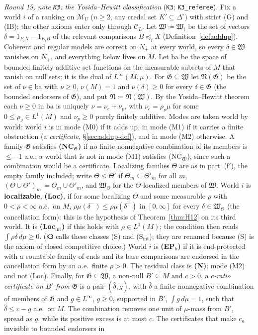 \documentclass[11pt]{article}
\theoremstyle{definition}
\theoremstyle{remark}
\newcommand{\Di}{\Delta^{\circ}}
\newcommand{\M}{\mathcal M}
\newcommand{\C}{\mathcal C}
\newcommand{\src}[1]{\texttt{#1}}
\begin{document}
\emph{Round 19, note \src{K3}: the Yosida--Hewitt classification} (\src{K3}; \src{K3\_referee}). Fix a world $i$ of a ranking on $\M_U$ ($n\ge2$, any credal set $K'\subseteq\Di$) with strict (G) and (IB); the other axioms enter only through $\C_L$. Let $\mathfrak W\coloneqq\mathfrak W_i$ be the set of vectors $\delta=1_{E_iX}-1_{E_iB}$ of the relevant comparisons $B\preceq_iX$ (Definition~\ref{def:addup}). Coherent and regular models are correct on $N_+$ at every world, so every $\delta\in\mathfrak W$ vanishes on $N_+$, and everything below lives on $M$. Let $\mathrm{ba}$ be the space of bounded finitely additive set functions on the measurable subsets of $M$ that vanish on null sets; it is the dual of $L^\infty(M,\mu)$. For $\mathfrak G\subseteq\mathfrak W$ let $\mathfrak N(\mathfrak G)$ be the set of $\nu\in\mathrm{ba}$ with $\nu\ge0$, $\nu(M)=1$ and $\nu(\delta)\ge0$ for every $\delta\in\mathfrak G$ (the bounded endorsers of $\mathfrak G$), and put $\mathfrak N\coloneqq\mathfrak N(\mathfrak W)$. By the Yosida--Hewitt theorem each $\nu\ge0$ in $\mathrm{ba}$ is uniquely $\nu=\nu_c+\nu_p$, with $\nu_c=\rho_\nu\mu$ for some $0\le\rho_\nu\in L^1(M)$ and $\nu_p\ge0$ purely finitely additive. Modes are taken world by world: world $i$ is in mode (M0) if it adds up, in mode (M1) if it carries a finite obstruction (a \emph{certificate}, \S\ref{sec:addup-def}), and in mode (M2) otherwise. A family $\mathfrak G$ satisfies \textbf{(NC$_{\mathfrak G}$)} if no finite nonnegative combination of its members is $\le-1$ a.e.; a world that is not in mode (M1) satisfies (NC$_{\mathfrak W}$), since such a combination would be a certificate. Localizing families $\Theta$ are as in part~(f$'$), the empty family included; write $\Theta\le\Theta'$ if $\Theta_m\subseteq\Theta'_m$ for all $m$, $(\Theta\cup\Theta')_m\coloneqq\Theta_m\cup\Theta'_m$, and $\mathfrak W_\Theta$ for the $\Theta$-localized members of $\mathfrak W$. World $i$ is \textbf{localizable}, \textbf{(Loc)}, if for some localizing $\Theta$ and some measurable $\rho$ with $0<\rho<\infty$ a.e.\ on $M$, $\rho\mu(\delta^-)\le\rho\mu(\delta^+)$ in $[0,\infty]$ for every $\delta\in\mathfrak W_\Theta$ (the cancellation form): this is the hypothesis of Theorem~\ref{thm:H12} on its third world. It is \textbf{(Loc$_{\mathrm{int}}$)} if this holds with $\rho\in L^1(M)$; the condition then reads $\int\rho\delta\,d\mu\ge0$. (\src{K3} calls these classes (S) and (S$_{\mathrm{int}}$); they are renamed because (S) is the axiom of closed competitive choice.) World $i$ is \textbf{(EP$_{\mathrm b}$)} if it is end-protected with a countable family of ends and its base comparisons are endorsed in the cancellation form by an a.e.\ finite $\rho>0$. The residual class is \textbf{(N)}: mode (M2) and not (Loc). Finally, for $\mathfrak G\subseteq\mathfrak W$, a non-null $B'\subseteq M$ and $c>0$, a \emph{$c$-ratio certificate on $B'$ from $\mathfrak G$} is a pair $(\hat\delta,g)$, with $\hat\delta$ a finite nonnegative combination of members of $\mathfrak G$ and $g\in L^\infty$, $g\ge0$, supported in $B'$, $\int g\,d\mu=1$, such that $\hat\delta\le c-g$ a.e.\ on $M$. The combination removes one unit of $\mu$-mass from $B'$, spread as $g$, while its positive excess is at most $c$. The certificates that make $c_a$ invisible to bounded endorsers in 
\end{document}
